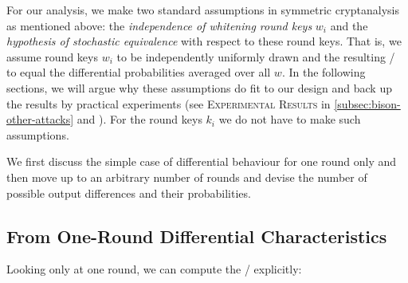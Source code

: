 For our analysis, we make two standard assumptions in symmetric cryptanalysis as mentioned above: the \emph{independence of whitening round keys} $w_i$ and the \emph{hypothesis of stochastic equivalence} with respect to these round keys.
That is, we assume round keys $w_i$ to be independently uniformly drawn and the resulting \EDP/ to equal the differential probabilities averaged over all $w$.
In the following sections, we will argue why these assumptions do fit to our design and back up the results by practical experiments (see \textsc{Experimental Results} in \cref{subsec:bison-other-attacks} and
\cite[Appendix~B]{EPRINT:CLLNW18}
).
For the round keys $k_i$ we do not have to make such assumptions.

We first discuss the simple case of differential behaviour for one round only and then move up to an arbitrary number of rounds and devise the number of possible output differences and their probabilities.


\subsection{From One-Round Differential Characteristics}
Looking only at one round, we can compute the \DDT/ explicitly:


